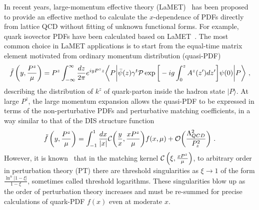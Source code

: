 \documentclass[a4paper,11pt]{article}
\begin{document}
In recent years, large-momentum effective theory (LaMET)~\cite{Ji:2013dva,Ji:2014gla,Cichy:2018mum,Ji:2020ect} has been proposed to provide an effective method to calculate the $x$-dependence of PDFs directly from lattice QCD without fitting of unknown functional forms. For example, quark isovector PDFs have been calculated based on LaMET~\cite{Lin:2014zya,Alexandrou:2015rja,Chen:2016utp,Alexandrou:2016jqi,Alexandrou:2018pbm,Chen:2018xof,Lin:2018pvv,LatticeParton:2018gjr,Alexandrou:2018eet,Liu:2018hxv,Chen:2018fwa,Izubuchi:2019lyk,Shugert:2020tgq,Chai:2020nxw,Lin:2020ssv,Fan:2020nzz,Gao:2021dbh,Gao:2022iex,Su:2022fiu,LatticeParton:2022xsd,Gao:2022uhg}. The most common choice in LaMET applications is to start from the equal-time matrix element motivated from ordinary momentum distribution (quasi-PDF)
\begin{align}\label{eq:defquasi}
\tilde f \left(y,\frac{P^z}{\mu}\right)=P^z\int_{-\infty}^{\infty} \frac{dz}{2\pi}e^{iyP^z z}\bigg\langle P \bigg|\bar \psi(z)\gamma^t{\cal P}\exp \bigg[-ig\int_{0}^z A^z(z') dz' \bigg]\psi(0) \bigg|P\bigg\rangle \ ,
\end{align}
describing the distribution of $k^z$ of quark-parton inside the hadron state $| P\rangle$. At large $P^z$, the large momentum expansion allows the quasi-PDF to be expressed in terms of the non-perturbative PDFs and perturbative matching coefficients, in a way similar to that of the DIS structure function
\begin{align}\label{eq:factoP}
\tilde f\left(y,\frac{P^z}{\mu}\right)=\int_{-1}^{1} \frac{dx}{|x|}{\cal C}\bigg(\frac{y}{x},\frac{xP^z}{\mu}\bigg)f(x,\mu)+{\cal O}\bigg(\frac{\Lambda_{QCD}^2}{P_z^2}\bigg) \ .
\end{align}
However, it is known~\cite{Xiong:2013bka,Gao:2021hxl} that in the matching kernel ${\cal C}\left(\xi,\frac{xP^z}{\mu} \right)$, to arbitrary order in perturbation theory (PT) there are threshold singularities as $\xi \rightarrow 1$ of the form $\frac{\ln^n |1-\xi|}{1-\xi}$, sometimes called threshold logarithms. These singularities blow up as the order of perturbation theory increases and must be re-summed for precise calculations of quark-PDF $f(x)$ even at moderate $x$. 
\end{document}
